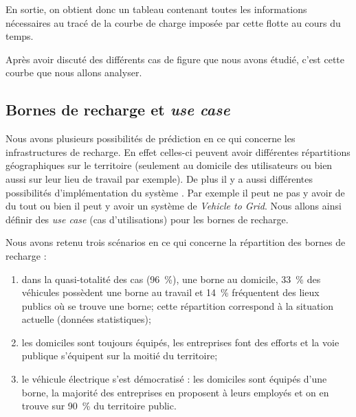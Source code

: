 			En sortie, on obtient donc un tableau contenant toutes les informations nécessaires au tracé de la courbe de charge imposée par cette flotte au cours du temps.
			
			Après avoir discuté des différents cas de figure que nous avons étudié, c'est cette courbe que nous allons analyser.
			
		
		
		\clearpage
		\subsection{  Bornes de recharge et \emph{use case} } \label{sec.useCases}
		
		Nous avons plusieurs possibilités de prédiction en ce qui concerne les infrastructures de recharge. En effet celles-ci peuvent avoir différentes répartitions géographiques sur le territoire (seulement au domicile des utilisateurs ou bien aussi sur leur lieu de travail par exemple).
		De plus il y a aussi différentes possibilités d'implémentation du système \smartgrid{}. Par exemple il peut ne pas y avoir de \smartgrid{} du tout ou bien il peut y avoir un système de \emph{Vehicle to Grid}.
		Nous allons ainsi définir des \textit{use case} (cas d'utilisations) pour les bornes de recharge. 
		
		Nous avons retenu trois scénarios en ce qui concerne la répartition des bornes de recharge :
		\begin{enumerate}
			\item dans la quasi-totalité des cas (\SI{96}{\percent}), une borne au domicile, \SI{33}{\percent} des véhicules possèdent une borne au travail et \SI{14}{\percent} fréquentent des lieux publics où se trouve une borne; cette répartition correspond à la situation actuelle (données statistiques);
			\item les domiciles sont toujours équipés, les entreprises font des efforts et la voie publique s'équipent sur la moitié du territoire;
			\item le véhicule électrique s'est démocratisé : les domiciles sont équipés d'une borne, la majorité des entreprises en proposent à leurs employés et on en trouve sur \SI{90}{\percent} du territoire public.
		\end{enumerate}
		
		\bigskip
		
